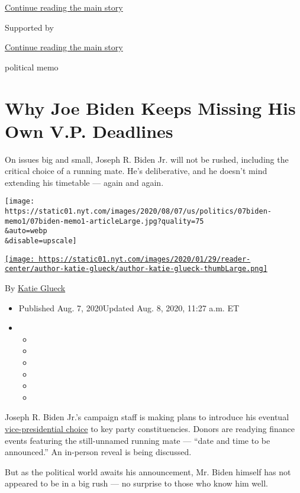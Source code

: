 \protect\hyperlink{after-top}{Continue reading the main story}

Supported by

\protect\hyperlink{after-sponsor}{Continue reading the main story}

political memo

\hypertarget{why-joe-biden-keeps-missing-his-own-vp-deadlines}{%
\section{Why Joe Biden Keeps Missing His Own V.P.
Deadlines}\label{why-joe-biden-keeps-missing-his-own-vp-deadlines}}

On issues big and small, Joseph R. Biden Jr. will not be rushed,
including the critical choice of a running mate. He's deliberative, and
he doesn't mind extending his timetable --- again and again.

\texttt{[image: https://static01.nyt.com/images/2020/08/07/us/politics/07biden-memo1/07biden-memo1-articleLarge.jpg?quality=75\\\&auto=webp\\\&disable=upscale]}

\href{https://www.nytimes.com/by/katie-glueck}{\texttt{[image: https://static01.nyt.com/images/2020/01/29/reader-center/author-katie-glueck/author-katie-glueck-thumbLarge.png]}}

By \href{https://www.nytimes.com/by/katie-glueck}{Katie Glueck}

\begin{itemize}
\item
  Published Aug. 7, 2020Updated Aug. 8, 2020, 11:27 a.m. ET
\item
  \begin{itemize}
  \item
  \item
  \item
  \item
  \item
  \item
  \end{itemize}
\end{itemize}

Joseph R. Biden Jr.'s campaign staff is making plans to introduce his
eventual
\href{https://www.nytimes.com/2020/08/08/us/politics/biden-vp-chris-dodd.html}{vice-presidential
choice} to key party constituencies. Donors are readying finance events
featuring the still-unnamed running mate --- ``date and time to be
announced.'' An in-person reveal is being discussed.

But as the political world awaits his announcement, Mr. Biden himself
has not appeared to be in a big rush --- no surprise to those who know
him well.

